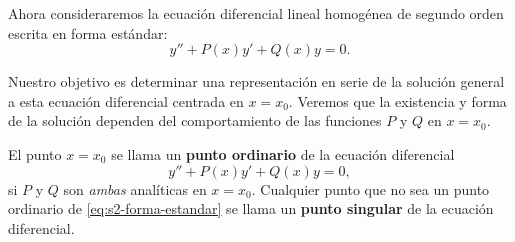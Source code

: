  
\makeatletter
\ifdefined\bbereffixdone\else
  \def\bbereffixdone{}
\fi
\makeatother
 
\providecommand{\bbezero}[2]{\addplot[bbegray!70, thin, forget plot] coordinates {(#1,0) (#2,0)};}
 
 
Ahora consideraremos la ecuación diferencial lineal homogénea de segundo orden escrita en forma estándar:
\[ y'' + P(x)y' + Q(x)y = 0. \]
 
Nuestro objetivo es determinar una representación en serie de la solución general a esta ecuación diferencial centrada en $x = x_0$. Veremos que la existencia y forma de la solución dependen del comportamiento de las funciones $P$ y $Q$ en $x = x_0$.
 
\begin{definition}
    El punto $x = x_0$ se llama un \textbf{punto ordinario} de la ecuación diferencial
\begin{equation}
y'' + P(x)y' + Q(x)y = 0,
\label{eq:s2-forma-estandar}
\end{equation}
si $P$ y $Q$ son \textit{ambas} analíticas en $x = x_0$. Cualquier punto que no sea un punto ordinario de \eqref{eq:s2-forma-estandar} se llama un \textbf{punto singular} de la ecuación diferencial.
\end{definition}
 
